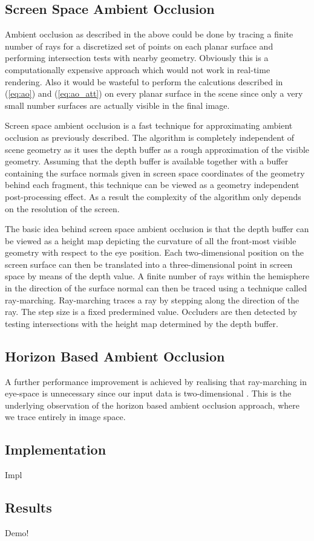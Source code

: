 \subsection{Screen Space Ambient Occlusion}
Ambient occlusion as described in the above could be done by tracing a
finite number of rays for a discretized set of points on each planar
surface and performing intersection tests with nearby
geometry. Obviously this is a computationally expensive approach which
would not work in real-time rendering. Also it would be wasteful to
perform the calcutions described in (\ref{eq:ao}) and
(\ref{eq:ao_att}) on every planar surface in the scene since only a
very small number surfaces are actually visible in the final image.

Screen space ambient occlusion \citep{ssao} is a fast technique for
approximating ambient occlusion as previously described. The algorithm
is completely independent of scene geometry as it uses the depth
buffer as a rough approximation of the visible geometry. Assuming that
the depth buffer is available together with a buffer containing the
surface normals given in screen space coordinates of the geometry
behind each fragment, this technique can be viewed as a geometry
independent post-processing effect. As a result the complexity of the
algorithm only depends on the resolution of the screen.

The basic idea behind screen space ambient occlusion is that the depth
buffer can be viewed as a height map depicting the curvature of
all the front-most visible geometry with respect to the eye
position. Each two-dimensional position on the screen surface
can then be translated into a three-dimensional point in screen space by
means of the depth value. A finite number of rays within the hemisphere
in the direction of the surface normal can then be traced using a
technique called ray-marching. Ray-marching traces a ray by stepping
along the direction of the ray. The step size is a fixed predermined
value. Occluders are then detected by testing intersections with the
height map determined by the depth buffer.

\subsection{Horizon Based Ambient Occlusion}
A further performance improvement is achieved by realising that
ray-marching in eye-space is unnecessary since our input data is
two-dimensional \citep{hbao}. This is the underlying observation of
the horizon based ambient occlusion approach, where we trace entirely
in image space. 

\subsection{Implementation}
Impl

\subsection{Results}
Demo!